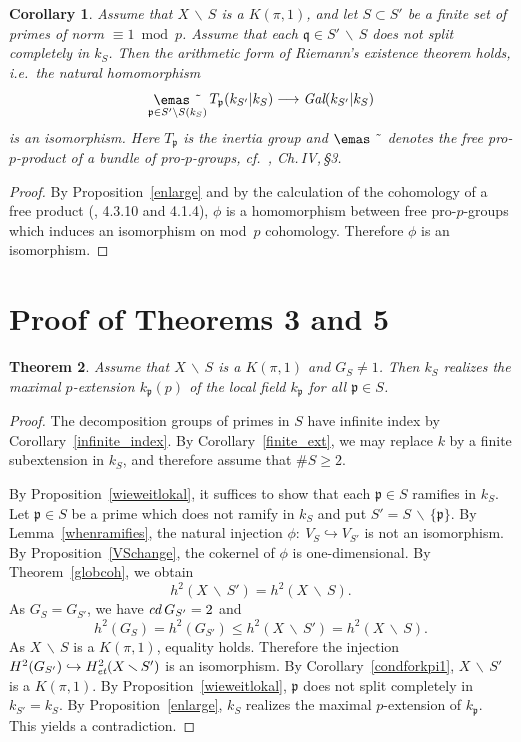\documentclass[10pt]{article}
\newcommand{\p}{{\mathfrak p}}
\newcommand{\q}{{\mathfrak q}}
\newcommand{\sm}{{\,\smallsetminus\,}}
\newcommand{\et}{\text{\it et}}
\newcommand{\cd}{\text{\it cd}\:}
\newcommand{\Gal}{\text{\it Gal}}
\newcommand{\freeproductmed}{\mathop{\lower.2mm\hbox{\emas \symbol{3}}}\limits}
\theoremstyle{alex}
\newtheorem{theorem}{Theorem}[section]
\newtheorem{corollary}[theorem]{Corollary}
\theoremstyle{alexdef}
\begin{document}
\begin{corollary} \label{riemann}
Assume that $X\sm S$ is a $K(\pi,1)$, and let $S\subset S'$ be a finite set of primes of norm $\equiv 1 \bmod p$. Assume that each $\q\in S'\sm S$ does not split completely in $k_S$. Then the arithmetic form of Riemann's existence theorem holds, i.e.\ the natural homomorphism
\[
\freeproductmed_{{\mathfrak p} \in S'\backslash S(k_S)} T_\p(k_{S'}|k_S) \longrightarrow \Gal(k_{S'}|k_S)
\]
is an isomorphism. Here $T_\p$ is the inertia group and $\freeproductmed$ denotes the free pro-$p$-product of a bundle of pro-$p$-groups, cf.\ \cite{NSW}, Ch.\,IV,\,\S3.
\end{corollary}

\begin{proof} By Proposition~\ref{enlarge} and by the calculation of the cohomology of a free product (\cite{NSW}, 4.3.10 and 4.1.4), $\phi$ is a homomorphism between free pro-$p$-groups which induces an isomorphism on mod~$p$ cohomology. Therefore $\phi$ is an isomorphism.
\end{proof}

\section{Proof of Theorems 3 and 5}
\begin{theorem} \label{allesda} Assume that $X\sm S$ is a $K(\pi,1)$ and $G_S\neq 1$. Then $k_S$ realizes the maximal  $p$-extension $k_\p (p)$ of the local field $k_\p$ for all $\p\in S$.
\end{theorem}

\begin{proof} The decomposition groups of primes in $S$ have infinite index by Corollary~\ref{infinite_index}. By Corollary~\ref{finite_ext}, we may replace $k$ by a finite subextension in $k_S$, and therefore assume that $\#S\geq 2$.

By Proposition~\ref{wieweitlokal}, it suffices to show that each $\p \in S$ ramifies in $k_S$. Let $\p \in S$ be a prime which does not ramify in $k_S$ and put $S'=S\sm \{\p\}$. By Lemma~\ref{whenramifies}, the natural injection $\phi\colon\ V_{S} \hookrightarrow V_{S'}$ is not an isomorphism. By Proposition~\ref{VSchange}, the cokernel of $\phi$ is one-dimensional. By Theorem~\ref{globcoh}, we obtain
\[
h^2(X \sm S')= h^2(X \sm S).
\]
As $G_S=G_{S'}$, we have $\cd G_{S'}=2$ and
\[
h^2(G_{S})= h^2(G_{S'}) \leq h^2(X \sm S') = h^2(X \sm S).
\]
As $X\sm S$ is a $K(\pi,1)$, equality holds. Therefore the injection $H^2(G_{S'})\hookrightarrow H^2_\et(X\sm S')$ is an isomorphism. By Corollary~\ref{condforkpi1}, $X\sm S'$ is a $K(\pi,1)$. By Proposition~\ref{wieweitlokal}, $\p$ does not split completely in $k_{S'}=k_S$. By Proposition~\ref{enlarge}, $k_S$ realizes the maximal $p$-extension of $k_\p$. This yields a contradiction.
\end{proof}
\end{document}
